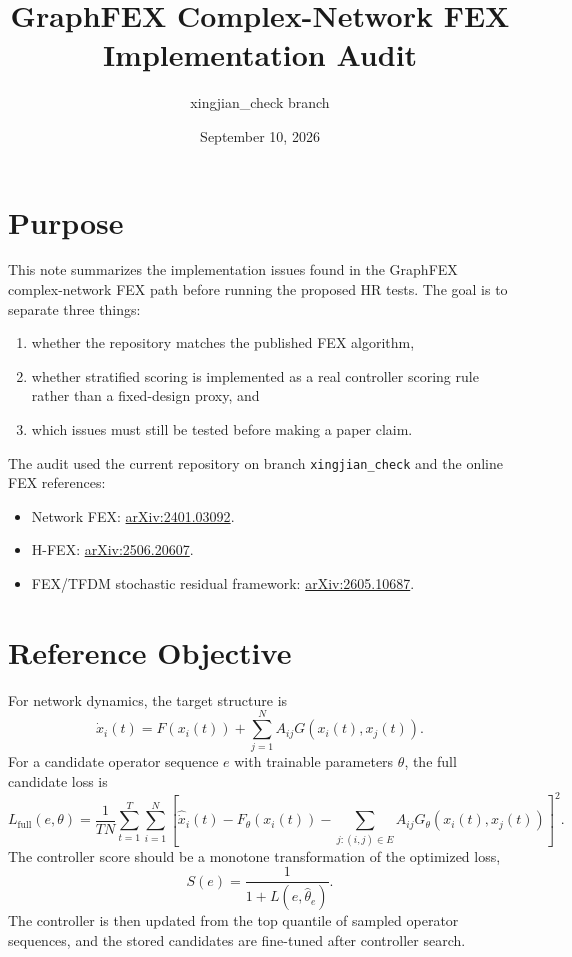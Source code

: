\documentclass[11pt]{article}
\title{GraphFEX Complex-Network FEX Implementation Audit}
\author{xingjian\_check branch}
\date{September 10, 2026}
\begin{document}
\maketitle

\section{Purpose}

This note summarizes the implementation issues found in the GraphFEX
complex-network FEX path before running the proposed HR tests.  The goal is to
separate three things:
\begin{enumerate}
    \item whether the repository matches the published FEX algorithm,
    \item whether stratified scoring is implemented as a real controller
    scoring rule rather than a fixed-design proxy, and
    \item which issues must still be tested before making a paper claim.
\end{enumerate}

The audit used the current repository on branch \verb|xingjian_check| and the
online FEX references:
\begin{itemize}
    \item Network FEX: \href{https://arxiv.org/abs/2401.03092}{arXiv:2401.03092}.
    \item H-FEX: \href{https://arxiv.org/abs/2506.20607}{arXiv:2506.20607}.
    \item FEX/TFDM stochastic residual framework:
    \href{https://arxiv.org/abs/2605.10687}{arXiv:2605.10687}.
\end{itemize}

\section{Reference Objective}

For network dynamics, the target structure is
\begin{equation}
    \dot{x}_i(t)
    =
    F(x_i(t))
    +
    \sum_{j=1}^{N} A_{ij}G(x_i(t),x_j(t)).
\end{equation}
For a candidate operator sequence $e$ with trainable parameters $\theta$, the
full candidate loss is
\begin{equation}
    L_{\mathrm{full}}(e,\theta)
    =
    \frac{1}{T N}
    \sum_{t=1}^{T}\sum_{i=1}^{N}
    \left[
    \widehat{\dot{x}}_i(t)
    -
    F_{\theta}(x_i(t))
    -
    \sum_{j:(i,j)\in E} A_{ij}
    G_{\theta}(x_i(t),x_j(t))
    \right]^2.
\end{equation}
The controller score should be a monotone transformation of the optimized loss,
\begin{equation}
    S(e)=\frac{1}{1+L(e,\widehat{\theta}_e)}.
\end{equation}
The controller is then updated from the top quantile of sampled operator
sequences, and the stored candidates are fine-tuned after controller search.
\end{document}
